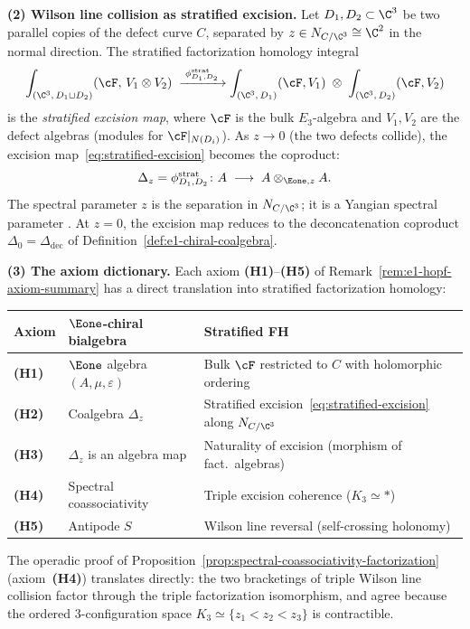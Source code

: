\medskip
\noindent\textbf{(2) Wilson line collision as stratified excision.}
Let $D_1, D_2 \subset \C^3$ be two parallel copies of the defect
curve $C$, separated by $z \in N_{C/\C^3} \cong \C^2$ in the normal
direction. The stratified factorization homology integral
\begin{equation}\label{eq:stratified-excision}
 \int_{(\C^3,\, D_1 \sqcup D_2)} (\cF,\, V_1 \otimes V_2)
 \;\xrightarrow{\;\phi^{\mathrm{strat}}_{D_1,D_2}\;}
 \int_{(\C^3,\, D_1)} (\cF, V_1)
 \;\otimes\;
 \int_{(\C^3,\, D_2)} (\cF, V_2)
\end{equation}
is the \emph{stratified excision map}, where $\cF$ is the bulk
$E_3$-algebra and $V_1, V_2$ are the defect algebras
(modules for $\cF|_{N(D_i)}$). As $z \to 0$ (the two defects
collide), the excision map~\eqref{eq:stratified-excision} becomes
the coproduct:
\[
 \Delta_z = \phi^{\mathrm{strat}}_{D_1,D_2}
 \colon A \;\longrightarrow\; A \otimes_{\Eone,z} A.
\]
The spectral parameter $z$ is the
separation in $N_{C/\C^3}$; it is a Yangian spectral parameter
. At $z = 0$, the excision
map reduces to the deconcatenation coproduct $\Delta_0 =
\Delta_{\mathrm{dec}}$ of Definition~\ref{def:e1-chiral-coalgebra}.

\medskip
\noindent\textbf{(3) The axiom dictionary.}
Each axiom \textbf{(H1)}--\textbf{(H5)} of
Remark~\ref{rem:e1-hopf-axiom-summary} has a direct translation
into stratified factorization homology:
\begin{center}
\small
\renewcommand{\arraystretch}{1.3}
\begin{tabular}{lll}
 \toprule
 \textbf{Axiom} & \textbf{$\Eone$-chiral bialgebra} &
 \textbf{Stratified FH} \\
 \midrule
 \textbf{(H1)} & $\Eone$ algebra $(A,\mu,\varepsilon)$ &
 Bulk $\cF$ restricted to $C$ with holomorphic ordering \\
 \textbf{(H2)} & Coalgebra $\Delta_z$ &
 Stratified excision~\eqref{eq:stratified-excision} along $N_{C/\C^3}$ \\
 \textbf{(H3)} & $\Delta_z$ is an algebra map &
 Naturality of excision (morphism of fact.\ algebras) \\
 \textbf{(H4)} & Spectral coassociativity &
 Triple excision coherence ($K_3 \simeq \ast$) \\
 \textbf{(H5)} & Antipode $S$ &
 Wilson line reversal (self-crossing holonomy) \\
 \bottomrule
\end{tabular}
\end{center}
The operadic proof of
Proposition~\ref{prop:spectral-coassociativity-factorization}
(axiom~\textbf{(H4)}) translates directly: the two bracketings of
triple Wilson line collision factor through the triple factorization
isomorphism, and agree because the ordered $3$-configuration space
$K_3 \simeq \{z_1 < z_2 < z_3\}$ is contractible.

